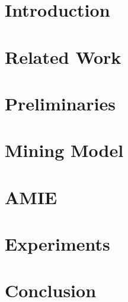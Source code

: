 \documentclass{www2013-accepted}
\begin{document}



\section{Introduction}
\label{sec:introduction}



\section{Related Work}
\label{sec:relatedWork}



\section{Preliminaries}
\label{sec:preliminaries}



\section{Mining Model}
\label{sec:model}



\section{AMIE}
\label{sec:alg}


\section{Experiments}
\label{sec:experiments}



\section{Conclusion}
\label{sec:conclusion}



\small
  
\end{document}
